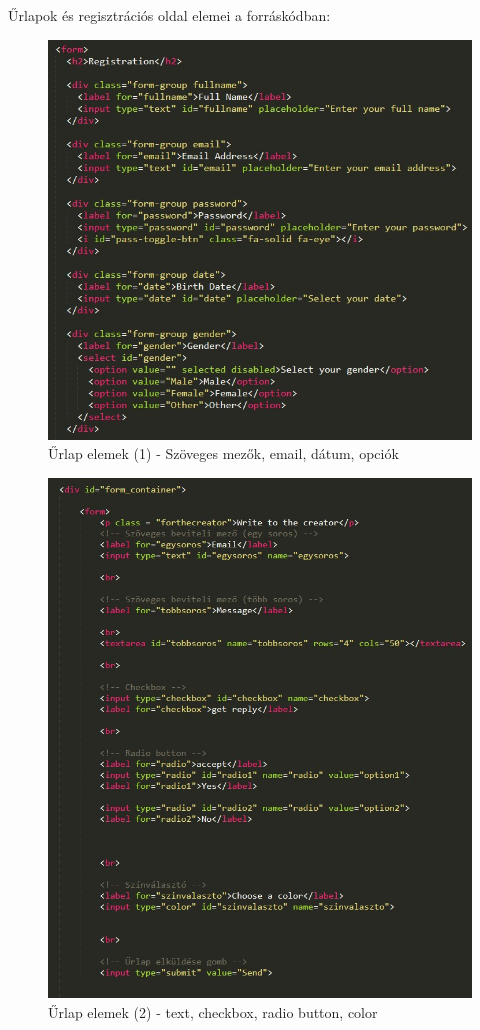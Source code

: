 \documentclass[12pt, titlepage]{article}
\begin{document}
Űrlapok és regisztrációs oldal elemei a forráskódban:

\begin{figure}[!h]
	\centering
	\includegraphics[width=\linewidth]{images/html/5.jpg}
	\caption{Űrlap elemek (1) - Szöveges mezők, email, dátum, opciók}
\end{figure}

\pagebreak
\begin{figure}[!h]
	\centering
	\includegraphics[width=\linewidth]{images/html/6.jpg}
	\caption{Űrlap elemek (2) - text, checkbox, radio button, color}
\end{figure}
\end{document}
